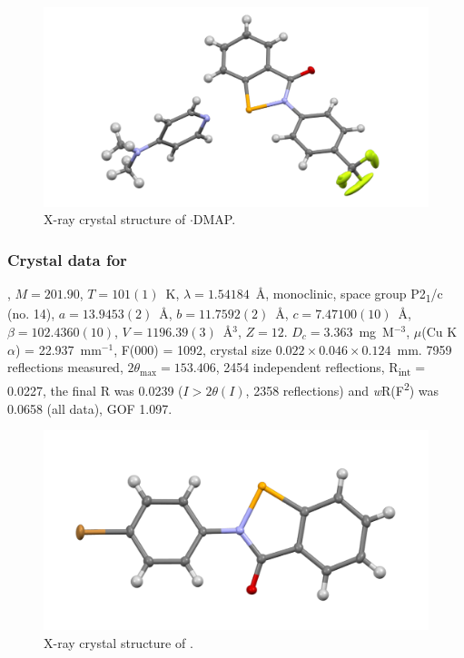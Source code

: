 \begin{refsection}
\begin{figure}
  \includegraphics[width=0.6\linewidth]{Figures/ebs-4cf3-dmap-xtal.pdf}
  \caption{X-ray crystal structure of \texorpdfstring{$\cdot$DMAP}{C21 H18 F3 N3 O Se}.}
\end{figure}

\subsubsection{Crystal data for \texorpdfstring{}{C13 H8 Br N O Se}}
, $M=201.90$, $T=101(1)$~K, $\lambda=1.54184$~\AA, monoclinic, space group P2\textsubscript{1}/c (no. 14), $a = 13.9453(2)$~\AA, $b = 11.7592(2)$~\AA, $c = 7.47100(10)$~\AA, $\beta = 102.4360(10)$\degree, $V = 1196.39(3)$~\AA$^{3}$, $Z = 12$. $D_{c}= 3.363$~mg~M$^{-3}$, $\mu$(Cu K$\alpha$) = 22.937~mm$^{-1}$, F(000) = 1092, crystal size $0.022 \times 0.046 \times 0.124$~mm. 7959 reflections measured, $2\theta_{\mathrm{max}}=153.406$\degree, 2454 independent reflections, R\textsubscript{int} = 0.0227, the final R was 0.0239 ($I > 2\theta(I)$, 2358 reflections) and \emph{w}R(F\textsuperscript{2}) was 0.0658 (all data), GOF 1.097.

\begin{figure}
  \includegraphics[width=0.6\linewidth]{Figures/ebs-4br-xtal.pdf}
  \caption{X-ray crystal structure of \texorpdfstring{}{C13 H8 Br N O Se}.}
\end{figure}


\end{refsection}
